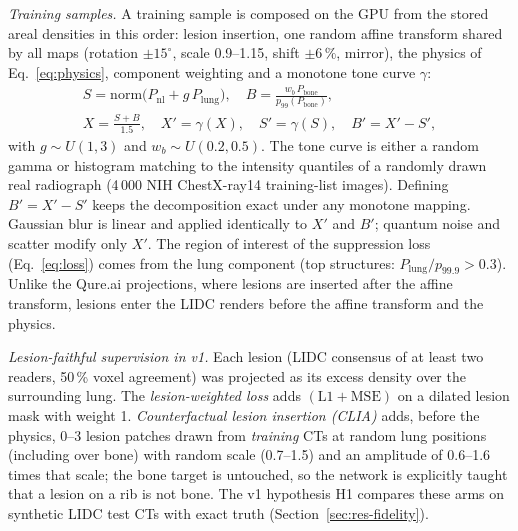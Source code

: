\emph{Training samples.} A training sample is composed on the GPU from the stored areal densities in this order: lesion insertion, one
random affine transform shared by all maps (rotation $\pm15^\circ$, scale 0.9--1.15, shift $\pm6\,\%$, mirror), the physics of
Eq.~\eqref{eq:physics}, component weighting and a monotone tone curve $\gamma$:
\begin{equation}
\begin{gathered}
S=\mathrm{norm}\big(P_{\mathrm{nl}}+g\,P_{\mathrm{lung}}\big),\quad B=\frac{w_b\,P_{\mathrm{bone}}}{p_{99}(P_{\mathrm{bone}})},\\
X=\frac{S+B}{1.5},\quad X'=\gamma(X),\quad S'=\gamma(S),\quad B'=X'-S',
\end{gathered}
\label{eq:compose}
\end{equation}
with $g\sim U(1,3)$ and $w_b\sim U(0.2,0.5)$. The tone curve is either a random gamma or histogram matching to the intensity quantiles of
a randomly drawn real radiograph (4\,000 NIH ChestX-ray14 training-list images). Defining $B'=X'-S'$ keeps the decomposition exact under
any monotone mapping. Gaussian blur is linear and applied identically to $X'$ and $B'$; quantum noise and scatter modify only $X'$. The
region of interest of the suppression loss (Eq.~\eqref{eq:loss}) comes from the lung component (top structures:
$P_{\mathrm{lung}}/p_{99.9}>0.3$). Unlike the Qure.ai projections, where lesions are inserted after the affine transform, lesions enter the
LIDC renders before the affine transform and the physics.

\emph{Lesion-faithful supervision in v1.} Each lesion (LIDC consensus of at least two readers, 50\,\% voxel agreement) was projected as its
excess density over the surrounding lung. The \emph{lesion-weighted loss} adds $(\mathrm{L1}+\mathrm{MSE})$ on a dilated lesion mask with
weight 1. \emph{Counterfactual lesion insertion (CLIA)} adds, before the physics, 0--3 lesion patches drawn from \emph{training} CTs at
random lung positions (including over bone) with random scale (0.7--1.5) and an amplitude of 0.6--1.6 times that scale; the bone target is
untouched, so the network is explicitly taught that a lesion on a rib is not bone. The v1 hypothesis H1 compares these arms on synthetic
LIDC test CTs with exact truth (Section~\ref{sec:res-fidelity}).

